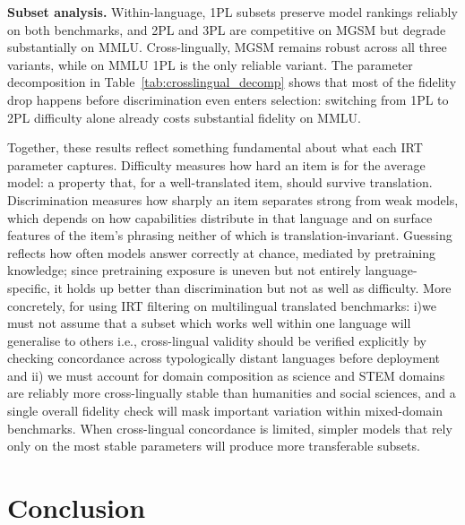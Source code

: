 \documentclass[11pt]{article}
\begin{document}
\textbf{Subset analysis.} Within-language, 1PL subsets preserve model rankings reliably on both benchmarks, and 2PL and 3PL are competitive on MGSM but degrade substantially on MMLU. Cross-lingually, MGSM remains robust across all three variants, while on MMLU 1PL is the only reliable variant. The parameter decomposition in Table~\ref{tab:crosslingual_decomp} shows that most of the fidelity drop happens before discrimination even enters selection: switching from 1PL to 2PL difficulty alone already costs substantial fidelity on MMLU.

Together, these results reflect something fundamental about what each IRT parameter captures. Difficulty measures how hard an item is for the average model: a property that, for a well-translated item, should survive translation. Discrimination measures how sharply an item separates strong from weak models, which depends on how capabilities distribute in that language and on surface features of the item's phrasing neither of which is translation-invariant. Guessing reflects how often models answer correctly at chance, mediated by pretraining knowledge; since pretraining exposure is uneven but not entirely language-specific, it holds up better than discrimination but not as well as difficulty.  More concretely, for using IRT filtering on multilingual translated benchmarks: i)we must not assume that a subset which works well within one language will generalise to others i.e.,  cross-lingual validity should be verified explicitly by checking concordance across typologically distant languages before deployment and ii) we must account for domain composition as science and STEM domains are reliably more cross-lingually stable than humanities and social sciences, and a single overall fidelity check will mask important variation within mixed-domain benchmarks. When cross-lingual concordance is limited, simpler models that rely only on the most stable parameters will produce more transferable subsets.



\section{Conclusion}
\end{document}

